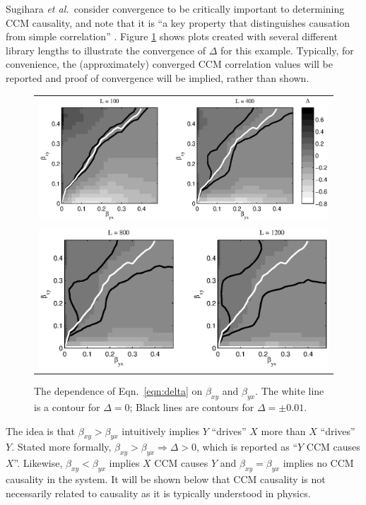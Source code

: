 \documentclass[twocolumn,aps,pre,groupedaddress]{revtex4-1}
\begin{document}
Sugihara {\em et al.\ }consider convergence to be critically important to determining CCM causality, and note that it is ``a key property that distinguishes causation from simple correlation'' \cite{Sugihara2012}.  Figure \ref{fig:BGridPlot} shows plots created with several different library lengths to illustrate the convergence of $\Delta$ for this example.  Typically, for convenience, the (approximately) converged CCM correlation values will be reported and proof of convergence will be implied, rather than shown.
\begin{figure}[ht]
\begin{tabular}{l}
\includegraphics[scale=0.5]{Figure1A.eps}\\
\includegraphics[scale=0.5]{Figure1B.eps}
\end{tabular}
\caption{The dependence of Eqn.\ \ref{eqn:delta} on $\beta_{xy}$ and $\beta_{yx}$.  The white line is a contour for $\Delta=0$; Black lines are contours for $\Delta=\pm 0.01$.}
\label{fig:BGridPlot}
\end{figure}

The idea is that $\beta_{xy}>\beta_{yx}$ intuitively implies $Y$ ``drives'' $X$ more than $X$ ``drives'' $Y$.  Stated more formally, $\beta_{xy}>\beta_{yx}\Rightarrow\Delta>0$, which is reported as ``$Y$ CCM causes $X$''.  Likewise, $\beta_{xy}<\beta_{yx}$ implies $X$ CCM causes $Y$ and $\beta_{xy}=\beta_{yx}$ implies no CCM causality in the system.  It will be shown below that CCM causality is not necessarily related to causality as it is typically understood in physics.
\end{document}

